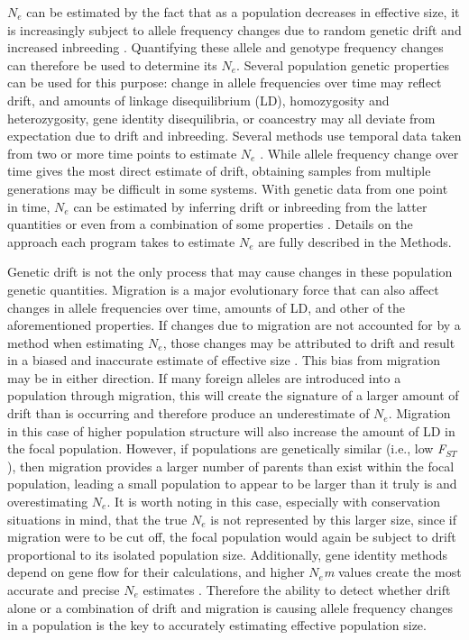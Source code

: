 $N_e$ can be estimated by the fact that as a population decreases in effective size, 
it is increasingly subject to allele frequency changes due to random genetic drift and increased 
inbreeding \citep{Caballero:1994}. Quantifying these allele and genotype frequency changes can therefore 
be used to determine its $N_e$. Several population genetic properties can be used for 
this purpose: change in allele frequencies over time may reflect drift, and amounts of linkage 
disequilibrium (LD), homozygosity and heterozygosity, gene identity disequilibria, or coancestry 
may all deviate from expectation due to drift and inbreeding. Several methods use temporal data 
taken from two or more time points to estimate $N_e$ \citep{Nei:1981, Pollak:1983, Beaumont:2003, 
Wang:2003, Anderson:2005, Jorde:2007}. While allele frequency change over time gives the most 
direct estimate of drift, obtaining samples from multiple generations 
may be difficult in some systems. With genetic data from one point in time, $N_e$ can be 
estimated by inferring drift or inbreeding from the latter quantities \citep{Hill:1981, Pudovkin:1996, Vitalis:2001a, Nomura:2008, Waples:2008, Wang:2009} or even from a combination of 
some properties \citep{Tallmon:2008}. Details on the approach each program takes to estimate 
$N_e$ are fully described in the Methods.

Genetic drift is not the only process that may cause changes in these population genetic 
quantities. Migration is a major evolutionary force that can also affect changes in allele 
frequencies over time, amounts of LD, and other of the aforementioned properties. If changes 
due to migration are not accounted for by a method when estimating $N_e$, those 
changes may be attributed to drift and result in a biased and inaccurate estimate of effective 
size \citep{Wang:2003}. This bias from migration may be in either direction. If many 
foreign alleles are introduced into a population through migration, this will create the signature 
of a larger amount of drift than is occurring and therefore produce an underestimate of 
$N_e$. Migration in this case of higher population structure will also increase 
the amount of LD in the focal population. However, if populations are genetically similar 
(i.e., low \emph{F}$_{ST}$), then migration provides a larger number of parents than exist within the 
focal population, leading a small population to appear to be larger than it truly is and 
overestimating $N_e$. It is worth noting in this case, especially with conservation 
situations in mind, that the true $N_e$ is not represented by this larger size, since 
if migration were to be cut off, the focal population would again be subject to drift proportional 
to its isolated population size. Additionally, gene identity methods depend on gene flow for their 
calculations, and higher $N_e$\emph{m} values create the most accurate and precise 
$N_e$ estimates \citep{Vitalis:2001a, Vitalis:2001b}. Therefore the ability to detect 
whether drift alone or a combination of drift and migration is causing allele frequency 
changes in a population is the key to accurately estimating effective population size.

